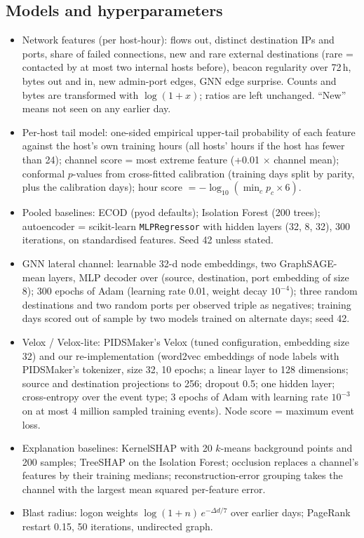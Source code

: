 \subsection{Models and hyperparameters}
\begin{itemize}
\item Network features (per host-hour): flows out, distinct destination IPs and ports, share of failed
connections, new and rare external destinations (rare = contacted by at most two internal hosts before), beacon
regularity over 72\,h, bytes out and in, new admin-port edges, GNN edge surprise. Counts and bytes are transformed
with $\log(1+x)$; ratios are left unchanged. ``New'' means not seen on any earlier day.
\item Per-host tail model: one-sided empirical upper-tail probability of each feature against the host's own
training hours (all hosts' hours if the host has fewer than 24); channel score = most extreme feature (+0.01 $\times$
channel mean); conformal $p$-values from cross-fitted calibration (training days split by parity, plus the calibration
days); hour score $=-\log_{10}(\min_c p_c \times 6)$.
\item Pooled baselines: ECOD (pyod defaults); Isolation Forest (200 trees); autoencoder = scikit-learn
\texttt{MLPRegressor} with hidden layers (32, 8, 32), 300 iterations, on standardised features. Seed 42 unless stated.
\item GNN lateral channel: learnable 32-d node embeddings, two GraphSAGE-mean layers, MLP decoder over
(source, destination, port embedding of size 8); 300 epochs of Adam (learning rate 0.01, weight decay $10^{-4}$);
three random destinations and two random ports per observed triple as negatives; training days scored out of sample
by two models trained on alternate days; seed 42.
\item Velox / Velox-lite: PIDSMaker's Velox (tuned configuration, embedding size 32) and our re-implementation
(word2vec embeddings of node labels with PIDSMaker's tokenizer, size 32, 10 epochs; a linear layer to 128 dimensions;
source and destination projections to 256; dropout 0.5; one hidden layer; cross-entropy over the event type; 3 epochs
of Adam with learning rate $10^{-3}$ on at most 4 million sampled training events). Node score = maximum event loss.
\item Explanation baselines: KernelSHAP with 20 $k$-means background points and 200 samples; TreeSHAP on the
Isolation Forest; occlusion replaces a channel's features by their training medians; reconstruction-error grouping
takes the channel with the largest mean squared per-feature error.
\item Blast radius: logon weights $\log(1+n)\,e^{-\Delta d/7}$ over earlier days; PageRank restart 0.15, 50
iterations, undirected graph.
\end{itemize}


